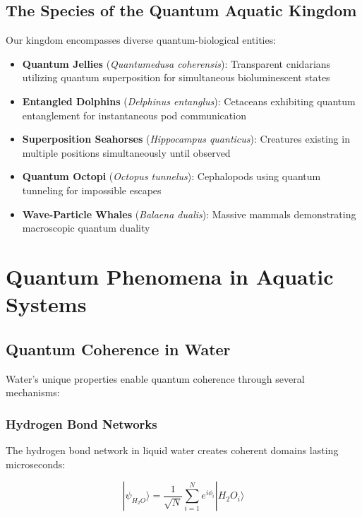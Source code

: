 \documentclass[11pt,a4paper]{article}
\begin{document}
\subsection{The Species of the Quantum Aquatic Kingdom}

Our kingdom encompasses diverse quantum-biological entities:

\begin{itemize}
    \item \textbf{Quantum Jellies} (\textit{Quantumedusa coherensis}): Transparent cnidarians utilizing quantum superposition for simultaneous bioluminescent states
    \item \textbf{Entangled Dolphins} (\textit{Delphinus entanglus}): Cetaceans exhibiting quantum entanglement for instantaneous pod communication
    \item \textbf{Superposition Seahorses} (\textit{Hippocampus quanticus}): Creatures existing in multiple positions simultaneously until observed
    \item \textbf{Quantum Octopi} (\textit{Octopus tunnelus}): Cephalopods using quantum tunneling for impossible escapes
    \item \textbf{Wave-Particle Whales} (\textit{Balaena dualis}): Massive mammals demonstrating macroscopic quantum duality
\end{itemize}

\section{Quantum Phenomena in Aquatic Systems}

\subsection{Quantum Coherence in Water}

Water's unique properties enable quantum coherence through several mechanisms:

\subsubsection{Hydrogen Bond Networks}

The hydrogen bond network in liquid water creates coherent domains lasting microseconds:

\begin{equation}
|\psi_{H_2O}\rangle = \frac{1}{\sqrt{N}} \sum_{i=1}^{N} e^{i\phi_i} |H_2O_i\rangle
\end{equation}
\end{document}
